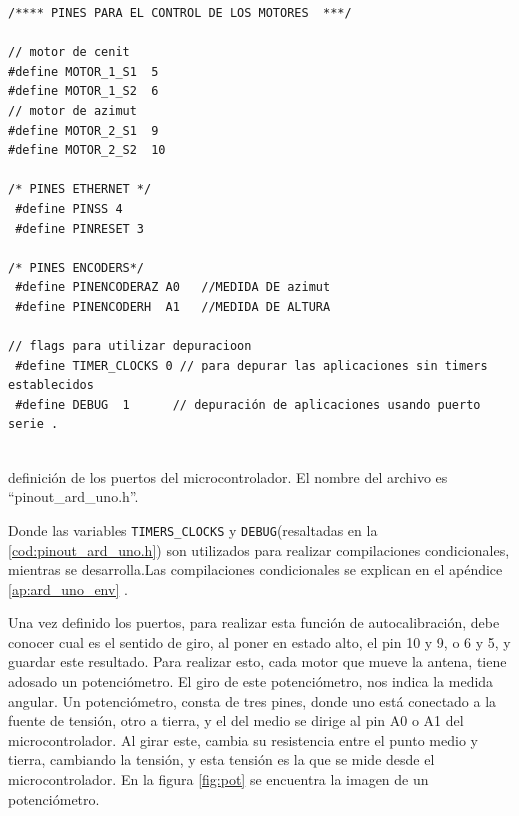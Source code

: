 \begin{listing}[ht]

	\begin{verbatim}
/**** PINES PARA EL CONTROL DE LOS MOTORES  ***/
		
// motor de cenit 
#define MOTOR_1_S1  5
#define MOTOR_1_S2  6
// motor de azimut 
#define MOTOR_2_S1  9 
#define MOTOR_2_S2  10 
		
/* PINES ETHERNET */
 #define PINSS 4
 #define PINRESET 3  
		
/* PINES ENCODERS*/
 #define PINENCODERAZ A0   //MEDIDA DE azimut 
 #define PINENCODERH  A1   //MEDIDA DE ALTURA 
		
// flags para utilizar depuracioon 
 #define TIMER_CLOCKS 0 // para depurar las aplicaciones sin timers establecidos  
 #define DEBUG  1      // depuración de aplicaciones usando puerto serie .  
		
\end{verbatim}
	\vspace{-5mm}
	\caption{definición de los puertos del microcontrolador. El nombre del archivo es ``pinout\_ard\_uno.h''.}
	\label{cod:pinout_ard_uno.h} 
\end{listing}
Donde las variables \texttt{TIMERS_CLOCKS} y \texttt{DEBUG}(resaltadas en la \ref{cod:pinout_ard_uno.h}) son utilizados para realizar compilaciones condicionales, mientras se desarrolla.Las compilaciones condicionales se explican en el apéndice \ref{ap:ard_uno_env} .
 
Una vez definido los puertos, para realizar esta función de autocalibración, debe conocer cual es el sentido de giro, al poner en estado alto, el pin 10 y 9, o 6 y 5, y guardar este resultado. Para realizar esto, cada motor que mueve la antena, tiene adosado un potenciómetro. El giro de este potenciómetro, nos indica la medida angular. Un potenciómetro, consta de tres pines, donde uno está conectado a la fuente de tensión, otro a tierra, y el del medio se dirige al pin A0 o A1 del microcontrolador. Al girar este, cambia su resistencia entre el punto medio y tierra, cambiando la tensión, y esta tensión es la que se mide desde el microcontrolador. En la figura
\ref{fig:pot} se encuentra la imagen de un potenciómetro. 


